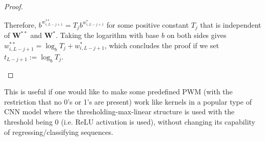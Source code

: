 \documentclass[12pt]{article}
\newcommand{\matrixSymbol}[1]{\mathbf{#1}}
\begin{document}
\begin{proof}
\begin{description}
Therefore, $b^{w^{**}_{i, L-j+1}} = T_jb^{w^{*}_{i, L-j+1}}$ for some positive constant $T_j$ that is independent of $\matrixSymbol{W}^{**}$ and $ \matrixSymbol{W}^{*} $. Taking the logarithm with base $b$ on both sides gives ${w^{**}_{i, L-j+1}} = \log_{b}T_j + {w^{*}_{i, L-j+1}}$, which concludes the proof if we set $t_{L-j+1} := \log_{b}T_j$.

\end{description}
\end{proof}

This is useful if one would like to make some predefined PWM (with the restriction that no 0's or 1's are present) work like kernels in a popular type of CNN model where the thresholding-max-linear structure is used with the threshold being 0 (i.e. ReLU activation is used), without changing its capability of regressing/classifying sequences. 
\end{document}
